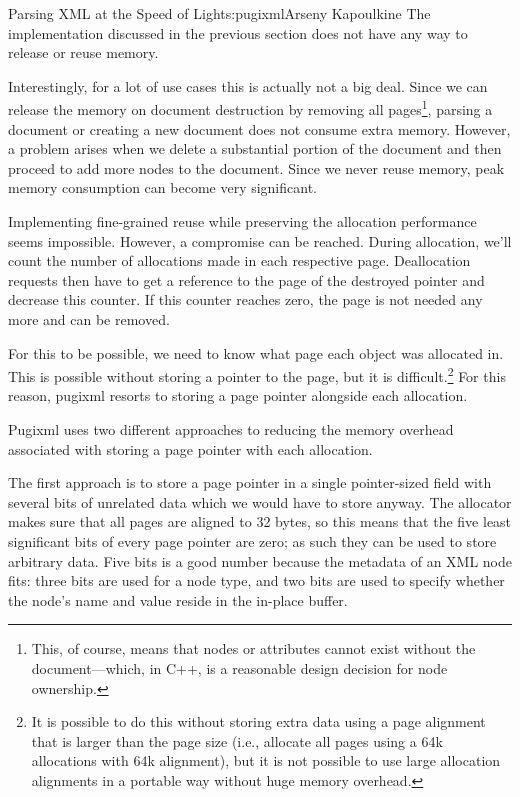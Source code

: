 \begin{aosachapter}{Parsing XML at the Speed of Light}{s:pugixml}{Arseny Kapoulkine}
The implementation discussed in the previous section does not have any
way to release or reuse memory.

Interestingly, for a lot of use cases this is actually not a big deal.
Since we can release the memory on document destruction by removing all
pages\footnote{This, of course, means that nodes or attributes cannot
  exist without the document---which, in C++, is a reasonable design
  decision for node ownership.}, parsing a document or creating a new
document does not consume extra memory. However, a problem arises when
we delete a substantial portion of the document and then proceed to add
more nodes to the document. Since we never reuse memory, peak memory
consumption can become very significant.

Implementing fine-grained reuse while preserving the allocation
performance seems impossible. However, a compromise can be reached.
During allocation, we'll count the number of allocations made in each
respective page. Deallocation requests then have to get a reference to
the page of the destroyed pointer and decrease this counter. If this
counter reaches zero, the page is not needed any more and can be
removed.

For this to be possible, we need to know what page each object was
allocated in. This is possible without storing a pointer to the page,
but it is difficult.\footnote{It is possible to do this without storing
  extra data using a page alignment that is larger than the page size
  (i.e., allocate all pages using a 64k allocations with 64k alignment),
  but it is not possible to use large allocation alignments in a
  portable way without huge memory overhead.} For this reason, pugixml
resorts to storing a page pointer alongside each allocation.

Pugixml uses two different approaches to reducing the memory overhead
associated with storing a page pointer with each allocation.

The first approach is to store a page pointer in a single pointer-sized
field with several bits of unrelated data which we would have to store
anyway. The allocator makes sure that all pages are aligned to 32 bytes,
so this means that the five least significant bits of every page pointer
are zero; as such they can be used to store arbitrary data. Five bits is
a good number because the metadata of an XML node fits: three bits are
used for a node type, and two bits are used to specify whether the
node's name and value reside in the in-place buffer.


\end{aosachapter}

